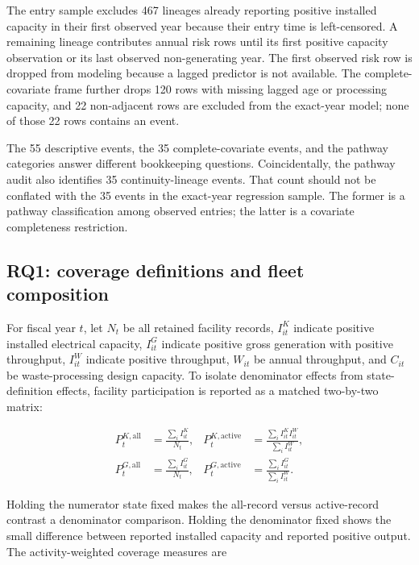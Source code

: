 \documentclass[12pt,a4paper]{article}
\begin{document}
The entry sample excludes 467 lineages already reporting positive installed
capacity in their first observed year because their entry time is left-censored.
A remaining lineage contributes annual risk rows until its first positive
capacity observation or its last observed non-generating year. The first
observed risk row is dropped from modeling because a lagged predictor is not
available. The complete-covariate frame further drops 120 rows with missing
lagged age or processing capacity, and 22 non-adjacent rows are excluded from
the exact-year model; none of those 22 rows contains an event.

The 55 descriptive events, the 35 complete-covariate events, and the pathway
categories answer different bookkeeping questions. Coincidentally, the pathway
audit also identifies 35 continuity-lineage events. That count should not be
conflated with the 35 events in the exact-year regression sample. The former is
a pathway classification among observed entries; the latter is a covariate
completeness restriction.

\subsection{RQ1: coverage definitions and fleet composition}

For fiscal year $t$, let $N_t$ be all retained facility records,
$I_{it}^{K}$ indicate positive installed electrical capacity, $I_{it}^{G}$
indicate positive gross generation with positive throughput, $I_{it}^{W}$
indicate positive throughput, $W_{it}$ be annual throughput, and $C_{it}$ be
waste-processing design capacity. To isolate denominator effects from state-
definition effects, facility participation is reported as a matched two-by-two
matrix:

\begin{align}
P_t^{K,\mathrm{all}}&=\frac{\sum_i I_{it}^{K}}{N_t},
&
P_t^{K,\mathrm{active}}&=
\frac{\sum_i I_{it}^{K}I_{it}^{W}}{\sum_i I_{it}^{W}},
\label{eq:installed-facility-coverage}\\
P_t^{G,\mathrm{all}}&=\frac{\sum_i I_{it}^{G}}{N_t},
&
P_t^{G,\mathrm{active}}&=
\frac{\sum_i I_{it}^{G}}{\sum_i I_{it}^{W}}.
\label{eq:output-facility-coverage}
\end{align}

Holding the numerator state fixed makes the all-record versus active-record
contrast a denominator comparison. Holding the denominator fixed shows the
small difference between reported installed capacity and reported positive
output. The activity-weighted coverage measures are
\end{document}
